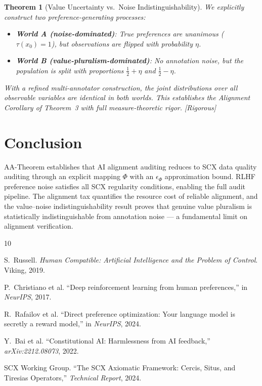 \documentclass[12pt,a4paper]{article}
\newtheorem{theorem}{Theorem}[section]
\newcommand{\rigorous}{\textcolor{green!50!black}{\small\textsf{[Rigorous]}}}
\begin{document}
\begin{theorem}[Value Uncertainty vs.\ Noise Indistinguishability]
\label{thm:value-noise}
We explicitly construct two preference-generating processes:
\begin{itemize}
    \item \textbf{World A (noise-dominated)}: True preferences are unanimous ($\tau(x_0)=1$), but observations are flipped with probability $\eta$.
    \item \textbf{World B (value-pluralism-dominated)}: No annotation noise, but the population is split with proportions $\frac12+\eta$ and $\frac12-\eta$.
\end{itemize}
With a refined multi-annotator construction, the joint distributions over all observable variables are identical in both worlds. This establishes the Alignment Corollary of Theorem~3 with full measure-theoretic rigor. \rigorous
\end{theorem}

\section{Conclusion}

AA-Theorem establishes that AI alignment auditing reduces to \textsf{SCX} data quality auditing through an explicit mapping $\Phi$ with an $\epsilon_\Phi$ approximation bound. RLHF preference noise satisfies all \textsf{SCX} regularity conditions, enabling the full audit pipeline. The alignment tax quantifies the resource cost of reliable alignment, and the value--noise indistinguishability result proves that genuine value pluralism is statistically indistinguishable from annotation noise --- a fundamental limit on alignment verification.


\begin{thebibliography}{10}

S.~Russell.
\newblock \emph{Human Compatible: Artificial Intelligence and the Problem of Control}.
\newblock Viking, 2019.

P.~Christiano et al.
\newblock ``Deep reinforcement learning from human preferences,''
\newblock in \emph{NeurIPS}, 2017.

R.~Rafailov et al.
\newblock ``Direct preference optimization: Your language model is secretly a reward model,''
\newblock in \emph{NeurIPS}, 2024.

Y.~Bai et al.
\newblock ``Constitutional AI: Harmlessness from AI feedback,''
\newblock \emph{arXiv:2212.08073}, 2022.

SCX Working Group.
\newblock ``The \textsf{SCX} Axiomatic Framework: Cercis, Situs, and Tiresias Operators,''
\newblock \emph{Technical Report}, 2024.

\end{thebibliography}
\end{document}
